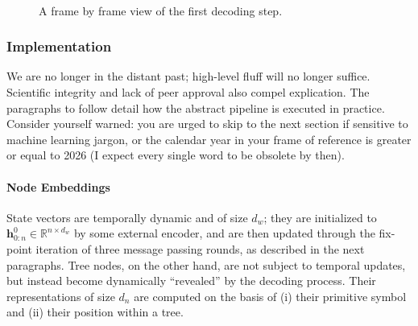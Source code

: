 \begin{figure}
\begin{subfigure}{0.85\textwidth}
    \end{subfigure}\\[\midsep]
    \caption{A frame by frame view of the first decoding step.}
    \label{figure:decoding_process}
\end{figure}


\subsubsection{Implementation}
We are no longer in the distant past; high-level fluff will no longer suffice.
Scientific integrity and lack of peer approval also compel explication.
The paragraphs to follow detail how the abstract pipeline is executed in practice. 
Consider yourself warned: you are urged to skip to the next section if sensitive to machine learning jargon, or the calendar year in your frame of reference is greater or equal to 2026 (I expect every single word to be obsolete by then).

\paragraph{Node Embeddings}
State vectors are temporally dynamic and of size $d_w$; they are initialized to $\mathbf{h}_{0:n}^0 \in \mathbb{R}^{n\times d_w}$ by some external encoder, and are then updated through the fix-point iteration of three message passing rounds, as described in the next paragraphs.
Tree nodes, on the other hand, are not subject to temporal updates, but instead become dynamically ``revealed'' by the decoding process. 
Their representations of size $d_n$ are computed on the basis of (i) their primitive symbol and (ii) their position within a tree.

